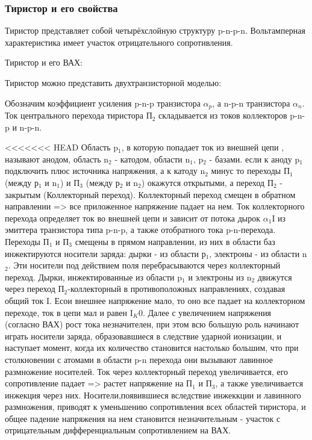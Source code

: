 \subsubsection{Тиристор и его свойства}

Тиристор представляет собой четырёхслойную структуру p-n-p-n. Вольтамперная характеристика имеет участок отрицательного сопротивления. 

Тиристор и его ВАХ:
\begin{center}
	\begin{figure}[h!]
		\caption{}	
	\end{figure}
\end{center}

Тиристор можно представить двухтранзисторной моделью:
\begin{center}
	\begin{figure}[h!]
		\caption{}	
	\end{figure}
\end{center}


Обозначим коэффициент усиления p-n-p транзистора $\alpha_p$, а n-p-n транзистора $\alpha_n$. Ток центрального перехода тиристора П$_2$ складывается из токов коллекторов p-n-p и n-p-n. 

<<<<<<< HEAD
Область p$_1$, в которую попадает ток из внешней цепи , называют анодом, область n$_2$  - катодом, области n$_1$, p$_2$ - базами. если к аноду p$_1$ подключить плюс источника напряжения, а к катоду n$_2$ минус то переходы П$_1$ (между р$_1$ и n$_1$) и  П$_3$ (между р$_2$ и n$_2$) окажутся открытыми, а переход П$_2$ - закрытым (Коллекторный переход). Коллекторный переход смещен в обратном направлении => все приложенное напряжение падает на нем. Ток коллекторного перехода определяет ток во внешней цепи и зависит от потока дырок $\alpha_1$I из эмиттера транзистора типа p-n-p, а также отобратного тока p-n-перехода. Переходы П$_1$ и П$_3$ смещены в прямом направлении, из них в области баз инжектируются носители заряда: дырки - из области р$_1$, электроны - из области n$_2$. Эти носители под действием поля перебрасываются через коллекторный переход. Дырки, инжектированные из области p$_1$ и электроны из n$_2$ движутся через переход П$_2$-коллекторный в противоположных направлениях, создавая общий ток I. Есои внешнее напряжение мало, то оно все падает на коллекторном переходе, ток в цепи мал и равен I$_K0$. Далее с увеличением напряжения (согласно ВАХ) рост тока незначителен, при этом всю большую роль начинают играть носители заряда, образовавшиеся в следствие ударной ионизации, и наступает момент, когда их количество становится настолько большим, что при столкновении с атомами в области p-n перехода они вызывают лавинное размножение носителей. Ток через коллекторный переход увеличивается, его сопротивление падает => растет напряжение на П$_1$ и П$_3$, а также увеличивается инжекция через них. Носители,появившиеся вследствие инжеккции и лавинного размножения, приводят к уменьшению сопротивления всех областей тиристора, и общее падение напряжения на нем становится незначительным - участок с отрицательным дифференциальным сопротивлением на ВАХ.

